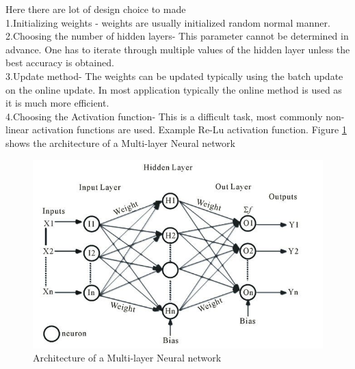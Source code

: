 \documentclass[sigconf]{acmart}
\begin{document}
Here there are lot of design choice to made\\
1.Initializing weights - weights are usually initialized random normal manner. \\
2.Choosing the number of hidden layers- This parameter cannot be determined in advance. One has to iterate through multiple values of the hidden layer unless the best accuracy is obtained.\\
3.Update method- The weights can be updated typically using the batch update on the online update. In most application typically the online method is used as it is much more efficient.\\
4.Choosing the Activation function- This is a difficult task, most commonly non-linear activation functions are used. Example Re-Lu activation function. Figure \ref{fig:Fig2} shows the architecture of a Multi-layer Neural network \\

\begin{figure}
\includegraphics[width=1.0\columnwidth]{images/fig2.jpg}
\caption{Architecture of a Multi-layer Neural network \cite{Williamson1}}
\label{fig:Fig2}
\end{figure}
\end{document}
